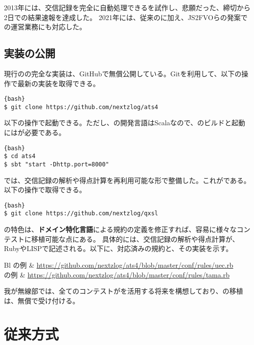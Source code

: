 \documentclass[10pt,a4paper]{book}
\begin{document}
2013年には、交信記録を完全に自動処理できるを試作し、悲願だった、締切から2日での結果速報を達成した。
2021年には、従来の\ja{}に加え、JS2FVOらの発案で\rt{}の運営業務にも対応した。

\section{実装の公開}

現行のの完全な実装は、GitHubで無償公開している。Gitを利用して、以下の操作で最新の実装を取得できる。

\begin{Verbatim}{bash}
$ git clone https://github.com/nextzlog/ats4
\end{Verbatim}

以下の操作で起動できる。ただし、の開発言語はScalaなので、のビルドと起動には\sbt{}が必要である。

\begin{Verbatim}{bash}
$ cd ats4
$ sbt "start -Dhttp.port=8000"
\end{Verbatim}

では、交信記録の解析や得点計算を再利用可能な形で整備した。これが\qxsl{}である。以下の操作で取得できる。

\begin{Verbatim}{bash}
$ git clone https://github.com/nextzlog/qxsl
\end{Verbatim}

の特色は、\textbf{ドメイン特化言語}による規約の定義を修正すれば、容易に様々なコンテストに移植可能な点にある。
具体的には、交信記録の解析や得点計算が、RubyやLISPで記述される。以下に、対応済みの規約と、その実装を示す。

\begin{table}[H]
\raggedright
\begin{tabular}{Bl}
\ue{}の例 & \url{https://github.com/nextzlog/ats4/blob/master/conf/rules/uec.rb} \\
\ta{}の例 & \url{https://github.com/nextzlog/ats4/blob/master/conf/rules/tama.rb} \\
\end{tabular}
\end{table}

我が無線部では、全てのコンテストがを活用する将来を構想しており、の移植は、無償で受け付ける。

\chapter{従来方式\label{chap:mail}}
\end{document}

